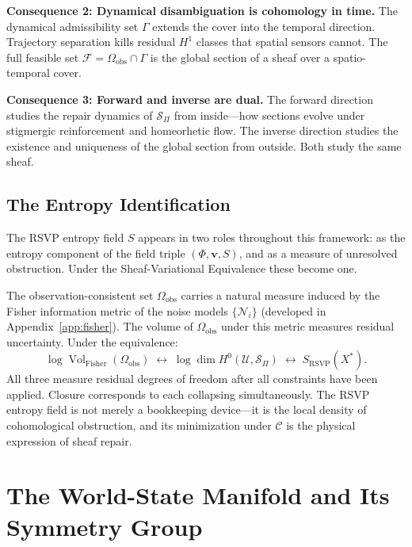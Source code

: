 \documentclass[12pt, oneside]{article}
\DeclareMathOperator{\vol}{Vol}
\begin{document}
\textbf{Consequence 2: Dynamical disambiguation is cohomology in time.} The dynamical
admissibility set $\Gamma$ extends the cover into the temporal direction. Trajectory
separation kills residual $H^1$ classes that spatial sensors cannot. The full feasible set
$\mathcal{F} = \Omega_{\mathrm{obs}} \cap \Gamma$ is the global section of a sheaf over a
spatio-temporal cover.

\textbf{Consequence 3: Forward and inverse are dual.} The forward direction studies the
repair dynamics of $\mathcal{S}_\Pi$ from inside---how sections evolve under stigmergic
reinforcement and homeorhetic flow. The inverse direction studies the existence and
uniqueness of the global section from outside. Both study the same sheaf.

\subsection{The Entropy Identification}

The RSVP entropy field $S$ appears in two roles throughout this framework: as the
entropy component of the field triple $(\Phi, \mathbf{v}, S)$, and as a measure of
unresolved obstruction. Under the Sheaf-Variational Equivalence these become one.

The observation-consistent set $\Omega_{\mathrm{obs}}$ carries a natural measure induced
by the Fisher information metric of the noise models $\{\mathcal{N}_i\}$ (developed in
Appendix~\ref{app:fisher}). The volume of $\Omega_{\mathrm{obs}}$ under this metric
measures residual uncertainty. Under the equivalence:
\[
\log \vol_{\mathrm{Fisher}}(\Omega_{\mathrm{obs}})
\;\longleftrightarrow\;
\log \dim H^0(\mathcal{U}, \mathcal{S}_\Pi)
\;\longleftrightarrow\;
S_{\mathrm{RSVP}}(X^*).
\]
All three measure residual degrees of freedom after all constraints have been applied.
Closure corresponds to each collapsing simultaneously. The RSVP entropy field is not
merely a bookkeeping device---it is the local density of cohomological obstruction, and
its minimization under $\mathcal{C}$ is the physical expression of sheaf repair.

\section{The World-State Manifold and Its Symmetry Group}
\label{sec:worldstate}
\end{document}
